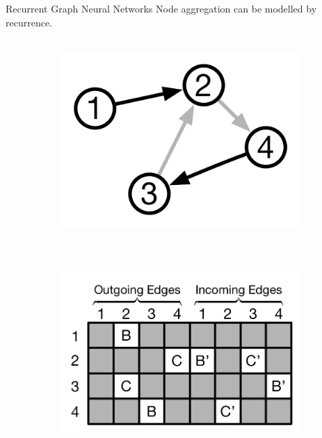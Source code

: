 \documentclass[final,hyperref={pdfpagelabels=false}]{beamer}
\begin{document}
\begin{frame}[t]
\begin{columns}[t]
\begin{column}{.3\textwidth}
    
    
    \vspace{-0.6in} 
    \begin{block}{Recurrent Graph Neural Networks}
    Node aggregation can be modelled by recurrence.
    
      \begin{figure}
        \centering
        \begin{subfigure}{.25\textwidth}
          \centering
          \includegraphics[height=3in]{imgs/example-graph.pdf}
          \caption{}
          \label{fig:sub1}
        \end{subfigure}%
        \hfill
        \begin{subfigure}{.43\textwidth}
          \centering
          \includegraphics[height=3in]{imgs/recurrent-matrix-sparsity-pattern2.pdf}
          \caption{}
          \label{fig:sub2}
        \end{subfigure}
        \begin{subfigure}{.25\textwidth}
          \centering

\end{subfigure}
\end{figure}
\end{block}
\end{column}
\end{columns}
\end{frame}
\end{document}
